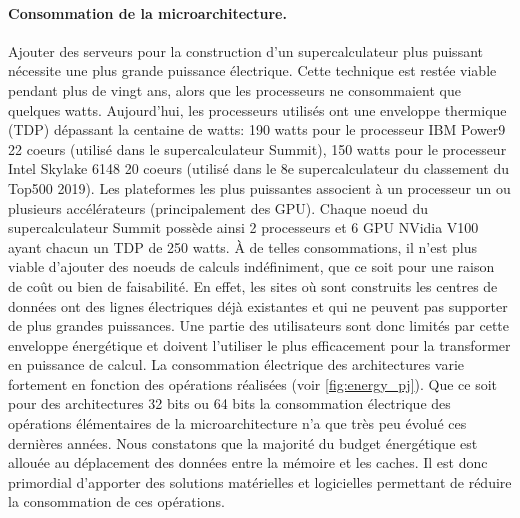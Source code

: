         
        
        \paragraph{Consommation de la microarchitecture.} 
            
            Ajouter des serveurs pour la construction d'un supercalculateur plus puissant nécessite une plus grande puissance électrique. Cette technique est restée viable pendant plus de vingt ans, alors que les processeurs ne consommaient que quelques watts. Aujourd'hui, les processeurs utilisés ont une enveloppe thermique (TDP) dépassant la centaine de watts: 190 watts pour le processeur IBM Power9 22 coeurs (utilisé dans le supercalculateur Summit), 150 watts pour le processeur Intel Skylake 6148 20 coeurs (utilisé dans le 8e supercalculateur du classement du Top500 2019). Les plateformes les plus puissantes associent à un processeur un ou plusieurs accélérateurs (principalement des GPU). Chaque noeud du supercalculateur Summit possède ainsi 2 processeurs et 6 GPU NVidia V100 ayant chacun un TDP de 250 watts. À de telles consommations, il n'est plus viable d'ajouter des noeuds de calculs indéfiniment, que ce soit pour une raison de coût ou bien de faisabilité. En effet, les sites où sont construits les centres de données ont des lignes électriques déjà existantes et qui ne peuvent pas supporter de plus grandes puissances. Une partie des utilisateurs sont donc limités par cette enveloppe énergétique et doivent l'utiliser le plus efficacement pour la transformer en puissance de calcul. La consommation électrique des architectures varie fortement en fonction des opérations réalisées (voir \autoref{fig:energy_pj}). Que ce soit pour des architectures 32 bits \cite{Horowitz2014} ou 64 bits \cite{Leland2014} la consommation électrique des opérations élémentaires de la microarchitecture n’a que très peu évolué ces dernières années. Nous constatons que la majorité du budget énergétique est allouée au déplacement des données entre la mémoire et les caches. Il est donc primordial d'apporter des solutions matérielles et logicielles permettant de réduire la consommation de ces opérations.
        
